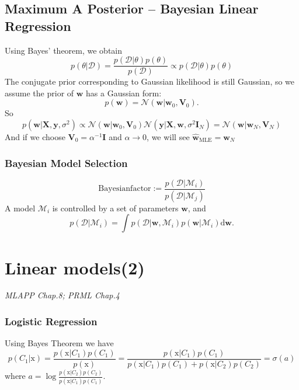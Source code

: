 \documentclass{article}
\newcommand{\normD}{\mathcal{N}}
\newcommand{\mrm}{\mathrm}
\newcommand{\mbf}{\mathbf}
\newcommand{\mcal}{\mathcal}
\begin{document}
\subsection*{Maximum A Posterior -- Bayesian Linear Regression}
Using Bayes' theorem, we obtain
\begin{equation}
    p(\theta|\mcal D) = \frac{p(\mcal D|\theta)p(\theta)}{p(\mcal D)} \propto p(\mcal D|\theta)p(\theta)
\end{equation}
The conjugate prior corresponding to Gaussian likelihood is still Gaussian, so we assume the prior of $\mbf w$ has a Gaussian form:
\begin{equation}
    p(\mbf w) = \normD (\mbf w|\mbf w_0,\mbf V_0).
\end{equation}
So 
\begin{equation}
    p(\mbf w|\mbf X,\mbf y, \sigma^2)\propto \normD(\mbf w|\mbf w_0,\mbf V_0)\normD(\mbf y|\mbf X,\mbf w,\sigma^2\mbf I_N) = \normD(\mbf w|\mbf w_N,\mbf V_N)
\end{equation}
And if we choose $\mbf V_0=\alpha^{-1}\mbf I$ and $\alpha\rightarrow 0$, we will see $\hat{\mbf w}_{\mrm{MLE}} = \mbf w_N$

\subsubsection*{Bayesian Model Selection}
\begin{equation}
    \mrm{Bayesian factor}:=\frac{p(\mcal D|\mcal M_i)}{p(\mcal D|\mcal M_j)}
\end{equation}
A model $\mcal M_i$ is controlled by a set of parameters $\mbf w$, and 
\begin{equation}
    p(\mcal D|\mcal M_i) = \int p(\mcal D|\mbf w,\mcal M_i)p(\mbf w|\mcal M_i)\mrm d\mbf w.
\end{equation}

\section{Linear models(2)}
\emph{MLAPP Chap.8; PRML Chap.4}

\subsubsection*{Logistic Regression}
Using Bayes Theorem we have 
\begin{equation}
    p(C_1|\mrm x) = \frac{p(\mrm x|C_1)p(C_1)}{p(\mrm x)} = \frac{p(\mrm x|C_1)p(C_1)}{p(\mrm x|C_1)p(C_1)+p(\mrm x|C_2)p(C_2)}=\sigma(a)
\end{equation}
where $a =\log\frac{p(\mrm x|C_2)p(C_2)}{p(\mrm x|C_1)p(C_1)}$.
\end{document}
